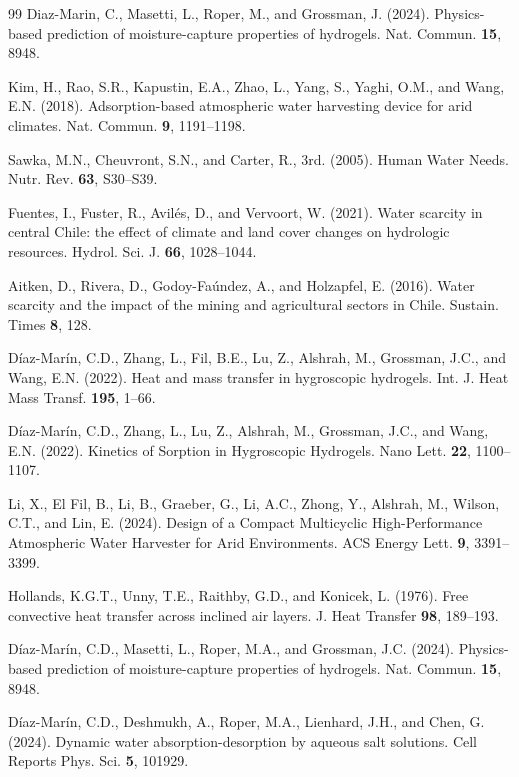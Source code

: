 \documentclass[11pt]{article}
\begin{document}
\begin{thebibliography}{99}
 Diaz-Marin, C., Masetti, L., Roper, M., and Grossman, J. (2024). Physics-based prediction of moisture-capture properties of hydrogels. Nat. Commun. \textbf{15}, 8948.

 Kim, H., Rao, S.R., Kapustin, E.A., Zhao, L., Yang, S., Yaghi, O.M., and Wang, E.N. (2018). Adsorption-based atmospheric water harvesting device for arid climates. Nat. Commun. \textbf{9}, 1191--1198.

 Sawka, M.N., Cheuvront, S.N., and Carter, R., 3rd. (2005). Human Water Needs. Nutr. Rev. \textbf{63}, S30--S39.

 Fuentes, I., Fuster, R., Avil{\'e}s, D., and Vervoort, W. (2021). Water scarcity in central Chile: the effect of climate and land cover changes on hydrologic resources. Hydrol. Sci. J. \textbf{66}, 1028--1044.

 Aitken, D., Rivera, D., Godoy-Fa{\'u}ndez, A., and Holzapfel, E. (2016). Water scarcity and the impact of the mining and agricultural sectors in Chile. Sustain. Times \textbf{8}, 128.

 D{\'i}az-Mar{\'i}n, C.D., Zhang, L., Fil, B.E., Lu, Z., Alshrah, M., Grossman, J.C., and Wang, E.N. (2022). Heat and mass transfer in hygroscopic hydrogels. Int. J. Heat Mass Transf. \textbf{195}, 1--66.

 D{\'i}az-Mar{\'i}n, C.D., Zhang, L., Lu, Z., Alshrah, M., Grossman, J.C., and Wang, E.N. (2022). Kinetics of Sorption in Hygroscopic Hydrogels. Nano Lett. \textbf{22}, 1100--1107.

 Li, X., El Fil, B., Li, B., Graeber, G., Li, A.C., Zhong, Y., Alshrah, M., Wilson, C.T., and Lin, E. (2024). Design of a Compact Multicyclic High-Performance Atmospheric Water Harvester for Arid Environments. ACS Energy Lett. \textbf{9}, 3391--3399.

 Hollands, K.G.T., Unny, T.E., Raithby, G.D., and Konicek, L. (1976). Free convective heat transfer across inclined air layers. J. Heat Transfer \textbf{98}, 189--193.

 D{\'i}az-Mar{\'i}n, C.D., Masetti, L., Roper, M.A., and Grossman, J.C. (2024). Physics-based prediction of moisture-capture properties of hydrogels. Nat. Commun. \textbf{15}, 8948.

 D{\'i}az-Mar{\'i}n, C.D., Deshmukh, A., Roper, M.A., Lienhard, J.H., and Chen, G. (2024). Dynamic water absorption-desorption by aqueous salt solutions. Cell Reports Phys. Sci. \textbf{5}, 101929.


\end{thebibliography}
\end{document}
